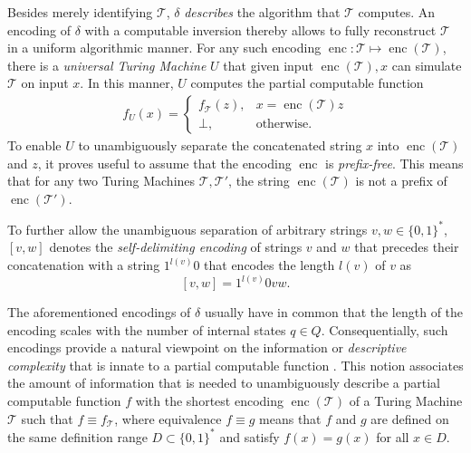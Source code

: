 Besides merely identifying $\mathcal{T}$, $\delta$ \textit{describes} the algorithm that $\mathcal{T}$ computes. 
An encoding of $\delta$ with a computable inversion thereby allows to fully reconstruct $\mathcal{T}$ in a uniform algorithmic manner.
\label{text:universal-tm}
For any such encoding $\operatorname{enc}:\mathcal{T}\mapsto \operatorname{enc}(\mathcal{T})$, there is a \textit{universal Turing Machine} $U$ that given input $\operatorname{enc}(\mathcal{T}),x$ can simulate $\mathcal{T}$ on input $x$.
In this manner, $U$ computes the partial computable function
\begin{align}
	\label{eq:universal-turing-machine}
	f_U(x)=\begin{cases}
		f_{\mathcal{T}}(z), & x=\operatorname{enc}(\mathcal{T})z\\
		\bot, & \text{otherwise}.
	\end{cases}
\end{align}
To enable $U$ to unambiguously separate the concatenated string $x$ into $\operatorname{enc}(\mathcal{T})$ and $z$, it proves useful to assume that the encoding $\operatorname{enc}$ is \textit{prefix-free}.
This means that for any two Turing Machines $\mathcal{T},\mathcal{T}'$, the string $\operatorname{enc}(\mathcal{T})$ is not a prefix of $\operatorname{enc}(\mathcal{T}'
)$.

To further allow the unambiguous separation of arbitrary strings $v,w\in\{0,1\}^{*}$, $[v,w]$ denotes the \textit{self-delimiting encoding} of strings $v$ and $w$ that precedes their concatenation with a string $1^{l(v)}0$ that encodes the length $l(v)$ of $v$ as
\begin{equation}
	\label{eq:self-delimiting-encoding}
	[v,w]=1^{l(v)}0vw.
\end{equation}

The aforementioned encodings of $\delta$ usually have in common that the length of the encoding scales with the number of internal states $q\in Q$.
Consequentially, such encodings provide a natural viewpoint on the information or \textit{descriptive complexity} that is innate to a partial computable function \cite{li2008kolmogorov}.
This notion associates the amount of information that is needed to unambiguously describe a partial computable function $f$ with the shortest encoding $\operatorname{enc}(\mathcal{T})$ of a Turing Machine $\mathcal{T}$ such that $f\equiv f_{\mathcal{T}}$, where equivalence $f \equiv g$ means that $f$ and $g$ are defined on the same definition range $D\subset\{0,1\}^{*}$ and satisfy $f(x)=g(x)$ for all $x\in D$.

